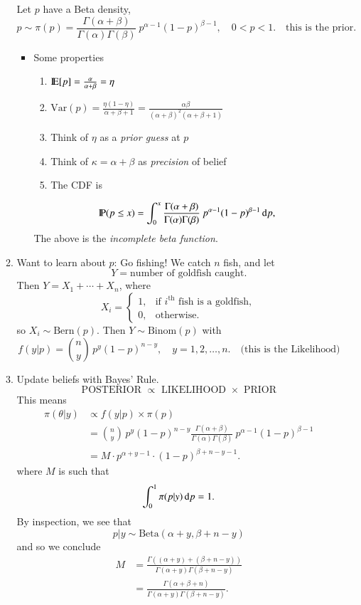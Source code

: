 \documentclass[captions=tableheading]{scrbook}
\begin{document}
\begin{itemize}
\begin{enumerate}
\begin{center}
   \end{center}
   Let $p$ have a Beta density,
   \begin{equation}
   p \sim \pi(p)=\frac{\Gamma(\alpha+\beta)}{\Gamma(\alpha)\Gamma(\beta)}\: p^{\alpha-1}(1-p)^{\beta-1},\quad 0 < p < 1. \quad \mbox {this is the prior.}
   \end{equation}
\begin{itemize}
\item Some properties
\begin{enumerate}
\item \(\mathrm{I\hspace{-1.5pt}E}[p] = \frac{\alpha}{\alpha+\beta}=\eta  \)
\item \(\mbox{Var}(p) = \frac{\eta(1 - \eta)}{\alpha + \beta + 1} = \frac{\alpha\beta}{(\alpha + \beta)^{2}(\alpha + \beta + 1)}   \)
\item Think of $\eta$ as a \emph{prior guess} at $p$
\item Think of \(\kappa = \alpha + \beta\) as \emph{precision} of belief
\item The CDF is
\end{enumerate}
\[
      \mathrm{I\hspace{-1.5pt}P}(p \leq x) = \int_{0}^{x}\frac{\Gamma(\alpha+\beta)}{\Gamma(\alpha)\Gamma(\beta)}\: p^{\alpha-1}(1-p)^{\beta-1}\,\mathrm{d} p,
      \]
      The above is the \emph{incomplete beta function}.
\end{itemize}
\item Want to learn about $p$:  Go fishing! We catch $n$ fish, and let
   \[
   Y = \mbox{number of goldfish caught.} 
   \]
   Then \( Y = X_{1}+\cdots+X_{n} \), where 
   \[
   X_{i}=
   \begin{cases}
   1, & \mbox{if $i^{\mathrm{th}}$ fish is a goldfish},\\
   0, & \mbox{otherwise}.
   \end{cases}
   \]
   so \(X_{i} \sim \mathrm{Bern}(p)\).  Then \(Y \sim \mathrm{Binom}(p)\) with
   \[
   f(y|p) = {n \choose y}\,p^{y}(1-p)^{n - y},\quad y = 1,2,\ldots,n. \quad \mbox{(this is the Likelihood)}
   \]
\item Update beliefs with Bayes' Rule.
   \[
   \mbox{POSTERIOR \(\propto\) LIKELIHOOD $\times$ PRIOR}
   \]
   This means
   \begin{align*}
   \pi(\theta|y)& \propto f(y|p) \times \pi(p)\\
   &= {n \choose y}\,p^{y}(1 - p)^{n - y}\frac{\Gamma(\alpha+\beta)}{\Gamma(\alpha)\Gamma(\beta)}\: p^{\alpha-1}(1-p)^{\beta-1}\\
   &= M \cdot p^{\alpha + y - 1}\cdot (1 - p)^{\beta + n - y - 1}.
   \end{align*}
   where $M$ is such that
   \[
   \int_{0}^{1}\pi(p|y)\,\mathrm{d} p = 1.
   \]
   By inspection, we see that
   \[
   p|y \sim \mathrm{Beta}(\alpha + y,\beta + n- y)
   \]
   and so we conclude
   \begin{align*}
   M &= \frac{\Gamma((\alpha + y)+(\beta+n-y))}{\Gamma(\alpha+y)\Gamma(\beta+n-y)}\\
   &= \frac{\Gamma(\alpha+\beta+n)}{\Gamma(\alpha+y)\Gamma(\beta+n-y)}.
   \end{align*}


\end{enumerate}
\end{itemize}
\end{document}
